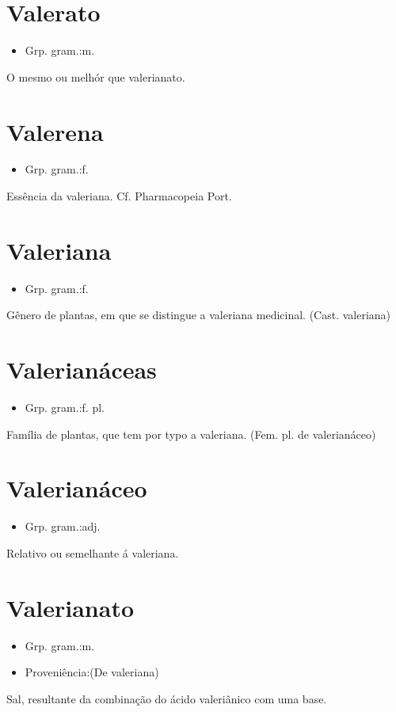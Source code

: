 \documentclass{article}
\begin{document}
\section{Valerato}
\begin{itemize}
\item {Grp. gram.:m.}
\end{itemize}
O mesmo ou melhór que \textunderscore valerianato\textunderscore .
\section{Valerena}
\begin{itemize}
\item {Grp. gram.:f.}
\end{itemize}
Essência da valeriana. Cf. \textunderscore Pharmacopeia Port.\textunderscore 
\section{Valeriana}
\begin{itemize}
\item {Grp. gram.:f.}
\end{itemize}
Gênero de plantas, em que se distingue a valeriana medicinal.
(Cast. \textunderscore valeriana\textunderscore )
\section{Valerianáceas}
\begin{itemize}
\item {Grp. gram.:f. pl.}
\end{itemize}
Família de plantas, que tem por typo a valeriana.
(Fem. pl. de \textunderscore valerianáceo\textunderscore )
\section{Valerianáceo}
\begin{itemize}
\item {Grp. gram.:adj.}
\end{itemize}
Relativo ou semelhante á valeriana.
\section{Valerianato}
\begin{itemize}
\item {Grp. gram.:m.}
\end{itemize}
\begin{itemize}
\item {Proveniência:(De \textunderscore valeriana\textunderscore )}
\end{itemize}
Sal, resultante da combinação do ácido valeriânico com uma base.
\end{document}
